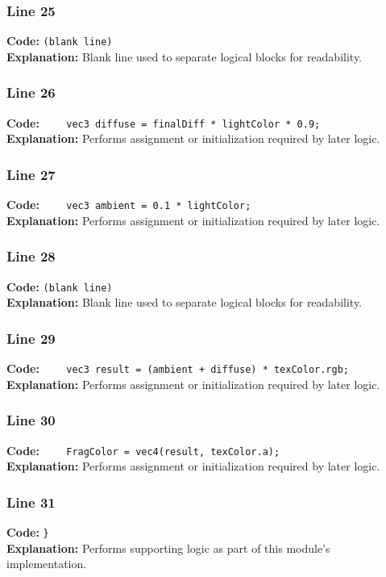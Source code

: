 \documentclass[11pt,a4paper]{article}
\begin{document}
\subsubsection*{Line 25}
\textbf{Code:} \texttt{(blank line)}\\
\textbf{Explanation:} Blank line used to separate logical blocks for readability.

\subsubsection*{Line 26}
\textbf{Code:} \verb|    vec3 diffuse = finalDiff * lightColor * 0.9;|\\
\textbf{Explanation:} Performs assignment or initialization required by later logic.

\subsubsection*{Line 27}
\textbf{Code:} \verb|    vec3 ambient = 0.1 * lightColor;|\\
\textbf{Explanation:} Performs assignment or initialization required by later logic.

\subsubsection*{Line 28}
\textbf{Code:} \texttt{(blank line)}\\
\textbf{Explanation:} Blank line used to separate logical blocks for readability.

\subsubsection*{Line 29}
\textbf{Code:} \verb|    vec3 result = (ambient + diffuse) * texColor.rgb;|\\
\textbf{Explanation:} Performs assignment or initialization required by later logic.

\subsubsection*{Line 30}
\textbf{Code:} \verb|    FragColor = vec4(result, texColor.a);|\\
\textbf{Explanation:} Performs assignment or initialization required by later logic.

\subsubsection*{Line 31}
\textbf{Code:} \verb|}|\\
\textbf{Explanation:} Performs supporting logic as part of this module's implementation.
\end{document}
